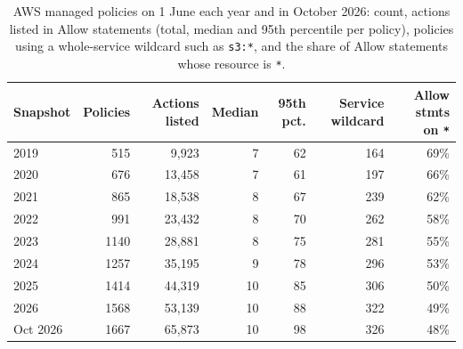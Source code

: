 \begin{table}[t]
\centering
\caption{AWS managed policies on 1 June each year and in October 2026: count, actions listed in Allow statements (total, median and 95th percentile per policy), policies using a whole-service wildcard such as \texttt{s3:*}, and the share of Allow statements whose resource is \texttt{*}.}
\label{tab:snap}
\small
\setlength{\tabcolsep}{4pt}
\begin{tabular}{lrrrrrr}
\toprule
Snapshot & Policies & Actions listed & Median & 95th pct. & Service wildcard & Allow stmts on \texttt{*} \\
\midrule
2019 & 515 & 9,923 & 7 & 62 & 164 & 69\% \\
2020 & 676 & 13,458 & 7 & 61 & 197 & 66\% \\
2021 & 865 & 18,538 & 8 & 67 & 239 & 62\% \\
2022 & 991 & 23,432 & 8 & 70 & 262 & 58\% \\
2023 & 1140 & 28,881 & 8 & 75 & 281 & 55\% \\
2024 & 1257 & 35,195 & 9 & 78 & 296 & 53\% \\
2025 & 1414 & 44,319 & 10 & 85 & 306 & 50\% \\
2026 & 1568 & 53,139 & 10 & 88 & 322 & 49\% \\
Oct 2026 & 1667 & 65,873 & 10 & 98 & 326 & 48\% \\
\bottomrule
\end{tabular}
\end{table}
